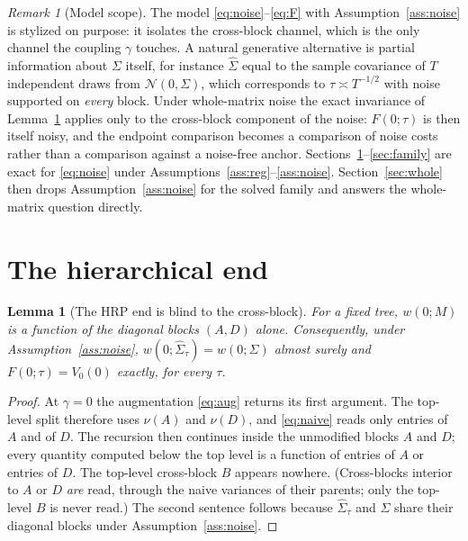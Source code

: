 \documentclass[11pt]{article}
\newtheorem{lemma}{Lemma}
\theoremstyle{remark}
\newtheorem{remark}{Remark}
\begin{document}
\begin{remark}[Model scope]
\label{rem:scope-model}
The model \eqref{eq:noise}--\eqref{eq:F} with Assumption~\ref{ass:noise} is
stylized on purpose: it isolates the cross-block channel, which is the only
channel the coupling $\gamma$ touches. A natural generative alternative is
partial information about $\Sigma$ itself, for instance $\widehat\Sigma$
equal to the sample covariance of $T$ independent draws from
$\mathcal{N}(0, \Sigma)$, which corresponds to $\tau \asymp T^{-1/2}$ with
noise supported on \emph{every} block. Under whole-matrix noise the exact
invariance of Lemma~\ref{lem:blind} applies only to the cross-block
component of the noise: $F(0;\tau)$ is then itself noisy, and the endpoint
comparison becomes a comparison of noise costs rather than a comparison
against a noise-free anchor. Sections~\ref{sec:endpoints}--\ref{sec:family}
are exact for \eqref{eq:noise} under
Assumptions~\ref{ass:reg}--\ref{ass:noise}. Section~\ref{sec:whole} then
drops Assumption~\ref{ass:noise} for the solved family and answers the
whole-matrix question directly.
\end{remark}

\section{The hierarchical end}
\label{sec:endpoints}

\begin{lemma}[The HRP end is blind to the cross-block]
\label{lem:blind}
For a fixed tree, $w(0; M)$ is a function of the diagonal blocks $(A, D)$
alone. Consequently, under Assumption~\ref{ass:noise},
$w(0; \widehat\Sigma_\tau) = w(0; \Sigma)$ almost surely and
$F(0; \tau) = V_0(0)$ exactly, for every $\tau$.
\end{lemma}
\begin{proof}
At $\gamma = 0$ the augmentation \eqref{eq:aug} returns its first argument.
The top-level split therefore uses $\nu(A)$ and $\nu(D)$, and
\eqref{eq:naive} reads only entries of $A$ and of $D$. The recursion then
continues inside the unmodified blocks $A$ and $D$; every quantity computed
below the top level is a function of entries of $A$ or entries of $D$. The
top-level cross-block $B$ appears nowhere. (Cross-blocks interior to $A$ or
$D$ \emph{are} read, through the naive variances of their parents; only the
top-level $B$ is never read.) The second sentence follows because
$\widehat\Sigma_\tau$ and $\Sigma$ share their diagonal blocks under
Assumption~\ref{ass:noise}.
\end{proof}
\end{document}
